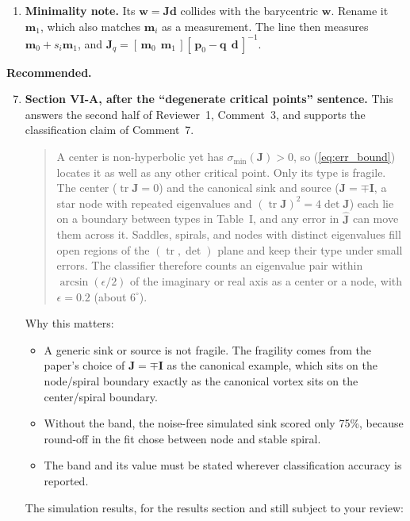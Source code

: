\documentclass[10pt]{article}
\begin{document}
\begin{enumerate}
\item \textbf{Minimality note.} Its $\mathbf{w} = \mathbf{J}\mathbf{d}$ collides with the barycentric $\mathbf{w}$. Rename it $\mathbf{m}_1$, which also matches $\mathbf{m}_i$ as a measurement. The line then measures $\mathbf{m}_0 + s_i\mathbf{m}_1$, and $\mathbf{J}_q = [\,\mathbf{m}_0\ \ \mathbf{m}_1\,][\,\mathbf{p}_0 - \mathbf{q}\ \ \mathbf{d}\,]^{-1}$.
\end{enumerate}

\noindent\textbf{Recommended.}
\begin{enumerate}
\setcounter{enumi}{6}
\item \textbf{Section VI-A, after the ``degenerate critical points'' sentence.} This answers the second half of Reviewer~1, Comment~3, and supports the classification claim of Comment~7.
\begin{quote}
A center is non-hyperbolic yet has $\sigma_{\min}(\mathbf{J}) > 0$, so (\ref{eq:err_bound}) locates it as well as any other critical point. Only its type is fragile. The center ($\operatorname{tr}\mathbf{J} = 0$) and the canonical sink and source ($\mathbf{J} = \mp\mathbf{I}$, a star node with repeated eigenvalues and $(\operatorname{tr}\mathbf{J})^2 = 4\det\mathbf{J}$) each lie on a boundary between types in Table~I, and any error in $\hat{\mathbf{J}}$ can move them across it. Saddles, spirals, and nodes with distinct eigenvalues fill open regions of the $(\operatorname{tr}, \det)$ plane and keep their type under small errors. The classifier therefore counts an eigenvalue pair within $\arcsin(\epsilon/2)$ of the imaginary or real axis as a center or a node, with $\epsilon = 0.2$ (about $6^\circ$).
\end{quote}
Why this matters:
\begin{itemize}
\item A generic sink or source is not fragile. The fragility comes from the paper's choice of $\mathbf{J} = \mp\mathbf{I}$ as the canonical example, which sits on the node/spiral boundary exactly as the canonical vortex sits on the center/spiral boundary.
\item Without the band, the noise-free simulated sink scored only 75\%, because round-off in the fit chose between node and stable spiral.
\item The band and its value must be stated wherever classification accuracy is reported.
\end{itemize}
The simulation results, for the results section and still subject to your review:
\begin{quote}

\end{quote}
\end{enumerate}
\end{document}
